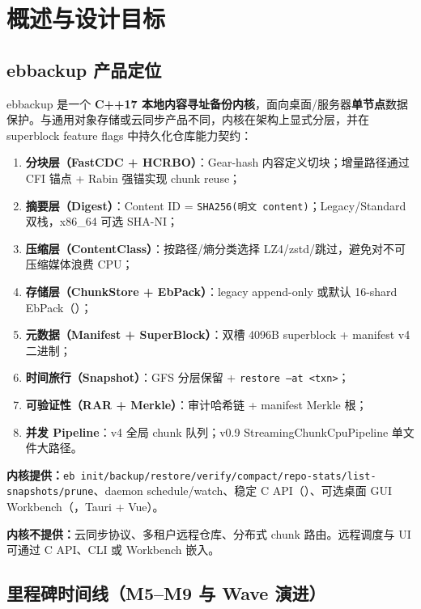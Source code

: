 \chapter{概述与设计目标}
\label{ch:overview}

\section{ebbackup 产品定位}

ebbackup 是一个 \textbf{C++17 本地内容寻址备份内核}，面向桌面/服务器\textbf{单节点}数据保护。与通用对象存储或云同步产品不同，内核在架构上显式分层，并在 superblock feature flags 中持久化仓库能力契约：

\begin{enumerate}
  \item \textbf{分块层（FastCDC + HCRBO）}：Gear-hash 内容定义切块；增量路径通过 CFI 锚点 + Rabin 强锚实现 chunk reuse；
  \item \textbf{摘要层（Digest）}：Content ID = \texttt{SHA256(明文 content)}；Legacy/Standard 双栈，x86\_64 可选 SHA-NI；
  \item \textbf{压缩层（ContentClass）}：按路径/熵分类选择 LZ4/zstd/跳过，避免对不可压缩媒体浪费 CPU；
  \item \textbf{存储层（ChunkStore + EbPack）}：legacy append-only 或默认 16-shard EbPack（）；
  \item \textbf{元数据（Manifest + SuperBlock）}：双槽 4096B superblock + manifest v4 二进制；
  \item \textbf{时间旅行（Snapshot）}：GFS 分层保留 + \texttt{restore --at <txn>}；
  \item \textbf{可验证性（RAR + Merkle）}：审计哈希链 + manifest Merkle 根；
  \item \textbf{并发 Pipeline}：v4 全局 chunk 队列；v0.9 StreamingChunkCpuPipeline 单文件大路径。
\end{enumerate}

\begin{designbox}[产品边界]
\textbf{内核提供：}\texttt{eb init/backup/restore/verify/compact/repo-stats/list-snapshots/prune}、daemon schedule/watch、稳定 C API（）、可选桌面 GUI Workbench（，Tauri + Vue）。

\textbf{内核不提供：}云同步协议、多租户远程仓库、分布式 chunk 路由。远程调度与 UI 可通过 C API、CLI 或 Workbench 嵌入。
\end{designbox}

\section{里程碑时间线（M5--M9 与 Wave 演进）}

